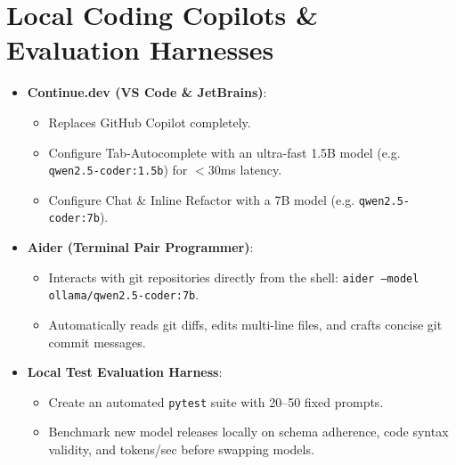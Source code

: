 \documentclass[11pt,a4paper]{article}
\begin{document}
\section{Local Coding Copilots \& Evaluation Harnesses}
\begin{itemize}
    \item \textbf{Continue.dev (VS Code \& JetBrains)}:
    \begin{itemize}
        \item Replaces GitHub Copilot completely.
        \item Configure Tab-Autocomplete with an ultra-fast 1.5B model (e.g. \texttt{qwen2.5-coder:1.5b}) for $<30$ms latency.
        \item Configure Chat \& Inline Refactor with a 7B model (e.g. \texttt{qwen2.5-coder:7b}).
    \end{itemize}
    \item \textbf{Aider (Terminal Pair Programmer)}:
    \begin{itemize}
        \item Interacts with git repositories directly from the shell: \texttt{aider --model ollama/qwen2.5-coder:7b}.
        \item Automatically reads git diffs, edits multi-line files, and crafts concise git commit messages.
    \end{itemize}
    \item \textbf{Local Test Evaluation Harness}:
    \begin{itemize}
        \item Create an automated \texttt{pytest} suite with 20--50 fixed prompts.
        \item Benchmark new model releases locally on schema adherence, code syntax validity, and tokens/sec before swapping models.
    \end{itemize}
\end{itemize}

\end{document}
